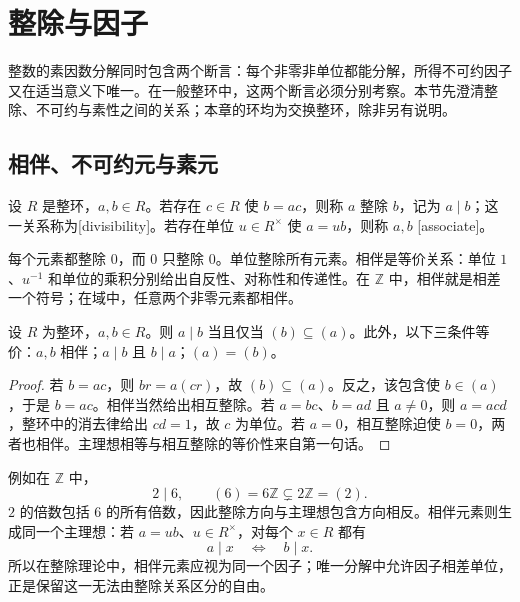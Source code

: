 
\section{整除与因子}
\label{b1:sec:1101}

%
%

整数的素因数分解同时包含两个断言：每个非零非单位都能分解，所得不可约因子又在适当意义下唯一。在一般整环中，这两个断言必须分别考察。本节先澄清整除、不可约与素性之间的关系；本章的环均为交换整环，除非另有说明。

\subsection{相伴、不可约元与素元}
\label{b1:subsec:1101:01}

\begin{definition}\label{b1:def:divisibility-associates}
	设 \(R\) 是整环，\(a,b\in R\)。若存在 \(c\in R\) 使 \(b=ac\)，则称 \(a\) 整除 \(b\)，记为 \(a\mid b\)；这一关系称为[divisibility]。若存在单位 \(u\in R^\times\) 使 \(a=ub\)，则称 \(a,b\) [associate]。
\end{definition}

每个元素都整除 \(0\)，而 \(0\) 只整除 \(0\)。单位整除所有元素。相伴是等价关系：单位 \(1\)、\(u^{-1}\) 和单位的乘积分别给出自反性、对称性和传递性。在 \(\mathbb Z\) 中，相伴就是相差一个符号；在域中，任意两个非零元素都相伴。

\begin{proposition}\label{b1:prop:associate-ideals}
	设 \(R\) 为整环，\(a,b\in R\)。则 \(a\mid b\) 当且仅当 \((b)\subseteq(a)\)。此外，以下三条件等价：\(a,b\) 相伴；\(a\mid b\) 且 \(b\mid a\)；\((a)=(b)\)。
\end{proposition}
\begin{proof}
	若 \(b=ac\)，则 \(br=a(cr)\)，故 \((b)\subseteq(a)\)。反之，该包含使 \(b\in(a)\)，于是 \(b=ac\)。相伴当然给出相互整除。若 \(a=bc\)、\(b=ad\) 且 \(a\ne0\)，则 \(a=acd\)，整环中的消去律给出 \(cd=1\)，故 \(c\) 为单位。若 \(a=0\)，相互整除迫使 \(b=0\)，两者也相伴。主理想相等与相互整除的等价性来自第一句话。
\end{proof}

例如在 \(\mathbb Z\) 中，
\[
	2\mid6,\qquad (6)=6\mathbb Z\subsetneq2\mathbb Z=(2).
\]
\(2\) 的倍数包括 \(6\) 的所有倍数，因此整除方向与主理想包含方向相反。相伴元素则生成同一个主理想：若 \(a=ub\)、\(u\in R^\times\)，对每个 \(x\in R\) 都有
\[
	a\mid x\quad\Longleftrightarrow\quad b\mid x.
\]
所以在整除理论中，相伴元素应视为同一个因子；唯一分解中允许因子相差单位，正是保留这一无法由整除关系区分的自由。

